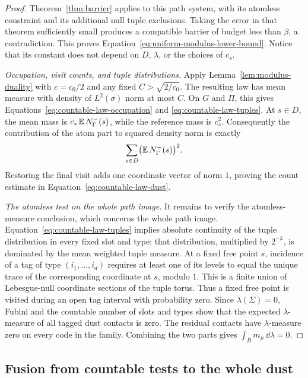 \begin{proof}
Theorem~\ref{thm:barrier} applies to this path system, with its atomless
constraint and its additional null tuple exclusions.  Taking the error in
that theorem sufficiently small produces a compatible barrier of budget
less than \(\beta\), a contradiction.  This proves
Equation~\eqref{eq:uniform-modulus-lower-bound}.  Notice that its constant
does not depend on \(D\), \(\lambda\), or the choices of \(c_s\).

\smallskip\noindent
\emph{Occupation, visit counts, and tuple distributions.}
Apply Lemma~\ref{lem:modulus-duality} with \(c=c_0/2\) and any fixed
\(C>\sqrt{2/c_0}\).  The resulting law has mean measure with density of
\(L^2(\sigma)\) norm at most \(C\).  On \(G\) and \(\Pi\), this gives
Equations~\eqref{eq:countable-law-occupation} and
\eqref{eq:countable-law-tuples}.  At \(s\in D\), the mean mass is
\(c_s\operatorname{\mathbb E} N^-_\Gamma(s)\), while the reference mass is \(c_s^2\).
Consequently the contribution of the atom part to squared density norm is
exactly
\[
 \sum_{s\in D}\bigl(\operatorname{\mathbb E} N^-_\Gamma(s)\bigr)^2.
\]
Restoring the final visit adds one coordinate vector of norm \(1\), proving
the count estimate in Equation~\eqref{eq:countable-law-dust}.

\smallskip\noindent
\emph{The atomless test on the whole path image.}
It remains to verify the atomless-measure conclusion, which concerns the
whole path image.  Equation~\eqref{eq:countable-law-tuples} implies absolute
continuity of the tuple distribution in every fixed slot and type: that
distribution, multiplied by \(2^{-k}\), is dominated by the mean weighted
tuple measure.  At a fixed free point \(s\), incidence of a tag of type
\((i_1,\ldots,i_d)\) requires at least one of its levels to equal the
unique trace of the corresponding coordinate at \(s\), modulo \(1\).
This is a finite union of Lebesgue-null coordinate sections of the tuple
torus.  Thus a fixed free point is visited during an open tag interval with
probability zero.  Since \(\lambda(\Sigma)=0\), Fubini and the countable
number of slots and types show that the expected \(\lambda\)-measure of
all tagged dust contacts is zero.  The residual contacts have
\(\lambda\)-measure zero on every code in the family.  Combining the two
parts gives \(\int_Bm_\mu\,\dd\lambda=0\).
\end{proof}

\subsection{Fusion from countable tests to the whole dust}


